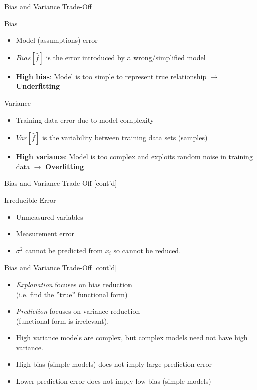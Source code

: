 \documentclass[ignorenonframetext,xcolor=x11names]{beamer}
\begin{document}
\begin{frame}{Bias and Variance Trade-Off}
\begin{block}{Bias}
  \begin{itemize}
     \item Model (assumptions) error
     \item $Bias[\hat{f}]$ is the error introduced by a wrong/simplified model
     \item \textbf{High bias}: Model is too simple to represent true relationship $\rightarrow$ \textbf{Underfitting}
   \end{itemize}
\end{block}
\begin{block}{Variance}
  \begin{itemize}
     \item Training data error due to model complexity 
     \item $Var[\hat{f}]$ is the variability between training data sets (samples)
     \item \textbf{High variance}: Model is too complex and exploits random noise in training data $\rightarrow$ \textbf{Overfitting}
  \end{itemize}
\end{block}
\end{frame}

\begin{frame}{Bias and Variance Trade-Off \small [cont'd]}
\begin{block}{Irreducible Error}
  \begin{itemize}
     \item Unmeasured variables
     \item Measurement error
     \item $\sigma^2$ cannot be predicted from $x_i$ so cannot be reduced.
  \end{itemize}
\end{block}
\end{frame}

\begin{frame}{Bias and Variance Trade-Off \small [cont'd]}
\begin{itemize}
  \item \emph{Explanation} focuses on bias reduction \\(i.e. find the ''true'' functional form)
  \item \emph{Prediction} focuses on variance reduction \\(functional form is irrelevant).
  \item High variance models are complex, but complex models need not have high variance.
  \item High bias (simple models) does not imply large prediction error
  \item Lower prediction error does not imply low bias (simple models)
\end{itemize}
\end{frame}
\end{document}
